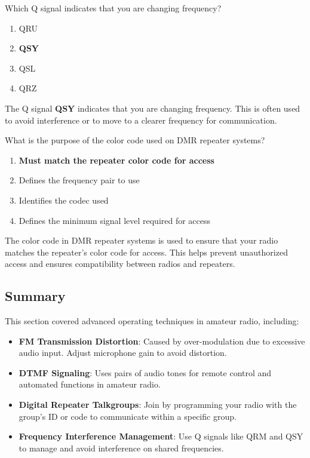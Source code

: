 
\begin{tcolorbox}[colback=gray!10!white,colframe=black!75!black,title={T2B11}]
    Which Q signal indicates that you are changing frequency?
    \begin{enumerate}[label=\Alph*),noitemsep]
        \item QRU
        \item \textbf{QSY}
        \item QSL
        \item QRZ
    \end{enumerate}
\end{tcolorbox}
The Q signal \textbf{QSY} indicates that you are changing frequency. This is often used to avoid interference or to move to a clearer frequency for communication.


\begin{tcolorbox}[colback=gray!10!white,colframe=black!75!black,title={T2B12}]
    What is the purpose of the color code used on DMR repeater systems?
    \begin{enumerate}[label=\Alph*),noitemsep]
        \item \textbf{Must match the repeater color code for access}
        \item Defines the frequency pair to use
        \item Identifies the codec used
        \item Defines the minimum signal level required for access
    \end{enumerate}
\end{tcolorbox}
The color code in DMR repeater systems is used to ensure that your radio matches the repeater's color code for access. This helps prevent unauthorized access and ensures compatibility between radios and repeaters.


\subsection*{Summary}
This section covered advanced operating techniques in amateur radio, including:
\begin{itemize}
    \item \textbf{FM Transmission Distortion}: Caused by over-modulation due to excessive audio input. Adjust microphone gain to avoid distortion.
    \item \textbf{DTMF Signaling}: Uses pairs of audio tones for remote control and automated functions in amateur radio.
    \item \textbf{Digital Repeater Talkgroups}: Join by programming your radio with the group's ID or code to communicate within a specific group.
    \item \textbf{Frequency Interference Management}: Use Q signals like QRM and QSY to manage and avoid interference on shared frequencies.
\end{itemize}
